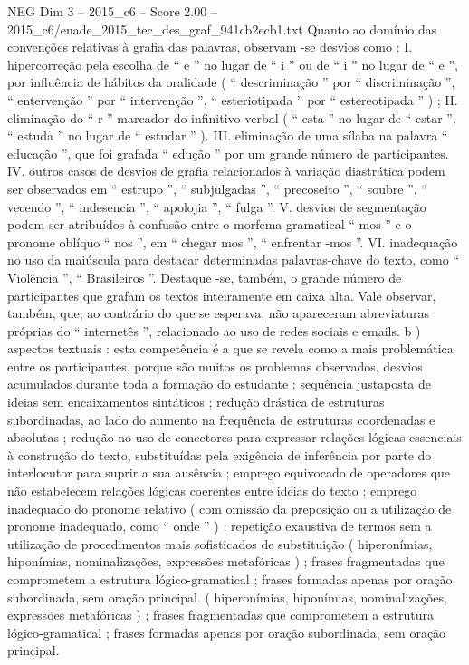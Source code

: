 \begin{textsample}{NEG Dim 3 – 2015\_c6 – Score 2.00 – 2015\_c6/enade\_2015\_tec\_des\_graf\_941cb2ecb1.txt}
Quanto ao domínio das convenções relativas à grafia das palavras, observam -se desvios como : I. hipercorreção pela escolha de “ e ” no lugar de “ i ” ou de “ i ” no lugar de “ e ”, por influência de hábitos da oralidade ( “ descriminação ” por “ discriminação ”, “ entervenção ” por “ intervenção ”, “ esteriotipada ” por “ estereotipada ” ) ; II. eliminação do “ r ” marcador do infinitivo verbal ( “ esta ” no lugar de “ estar ”, “ estuda ” no lugar de “ estudar ” ).
III. eliminação de uma sílaba na palavra “ educação ”, que foi grafada “ edução ” por um grande número de participantes.
IV. outros casos de desvios de grafia relacionados à variação diastrática podem ser observados em “ estrupo ”, “ subjulgadas ”, “ precoseito ”, “ soubre ”, “ vecendo ”, “ indesencia ”, “ apolojia ”, “ fulga ”.
V. desvios de segmentação podem ser atribuídos à confusão entre o morfema gramatical “ mos ” e o pronome oblíquo “ nos ”, em “ chegar mos ”, “ enfrentar -mos ”.
VI. inadequação no uso da maiúscula para destacar determinadas palavras-chave do texto, como “ Violência ”, “ Brasileiros ”.
Destaque -se, também, o grande número de participantes que grafam os textos inteiramente em caixa alta.
Vale observar, também, que, ao contrário do que se esperava, não apareceram abreviaturas próprias do “ internetês ”, relacionado ao uso de redes sociais e emails. b ) aspectos textuais : esta competência é a que se revela como a mais problemática entre os participantes, porque são muitos os problemas observados, desvios acumulados durante toda a formação do estudante : sequência justaposta de ideias sem encaixamentos sintáticos ; redução drástica de estruturas subordinadas, ao lado do aumento na frequência de estruturas coordenadas e absolutas ; redução no uso de conectores para expressar relações lógicas essenciais à construção do texto, substituídas pela exigência de inferência por parte do interlocutor para suprir a sua ausência ; emprego equivocado de operadores que não estabelecem relações lógicas coerentes entre ideias do texto ; emprego inadequado do pronome relativo ( com omissão da preposição ou a utilização de pronome inadequado, como “ onde ” ) ; repetição exaustiva de termos sem a utilização de procedimentos mais sofisticados de substituição ( hiperonímias, hiponímias, nominalizações, expressões metafóricas ) ; frases fragmentadas que comprometem a estrutura lógico-gramatical ; frases formadas apenas por oração subordinada, sem oração principal. ( hiperonímias, hiponímias, nominalizações, expressões metafóricas ) ; frases fragmentadas que comprometem a estrutura lógico-gramatical ; frases formadas apenas por oração subordinada, sem oração principal.

\end{textsample}
